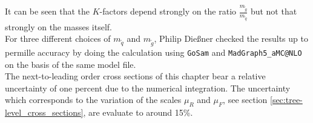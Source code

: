 It can be seen that the $K$-factors depend strongly on the ratio $\frac{m_{\tilde{g}}}{m_{\tilde{q}}}$ but not that strongly on the masses itself.\\
For three different choices of $m_{\tilde{q}}$ and $m_{\tilde{g}}$, Philip Dießner checked the results up to permille accuracy by doing the calculation using \texttt{GoSam}\cite{Cullen:2014yla, Cullen:2011ac} and \texttt{MadGraph5\_aMC@NLO}\cite{Alwall:2014hca} on the basis of the same model file.\\
The next-to-leading order cross sections of this chapter bear a relative uncertainty of one percent due to the numerical integration. The uncertainty which corresponds to the variation of the scales $\mu_R$ and $\mu_F$, see section \ref{sec:tree-level_cross_sections}, are evaluate to around 15\%.


